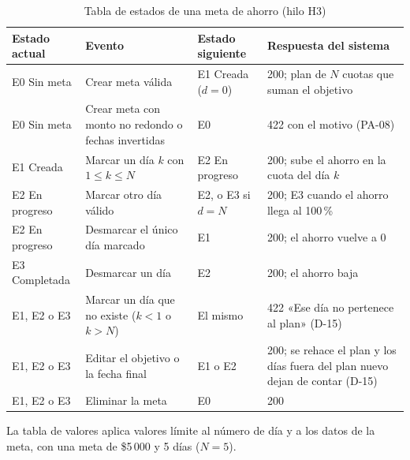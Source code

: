 \begin{table}[H]
\caption{Tabla de estados de una meta de ahorro (hilo H3)}
\label{tab:estados-h3}
\footnotesize
\begin{tabularx}{\linewidth}{L{2.4cm} L{3.4cm} L{2.6cm} Y}
\toprule
Estado actual & Evento & Estado siguiente & Respuesta del sistema \\
\midrule
E0 Sin meta & Crear meta válida & E1 Creada ($d = 0$) & 200; plan de $N$ cuotas que suman el objetivo \\
E0 Sin meta & Crear meta con monto no redondo o fechas invertidas & E0 & 422 con el motivo (PA-08) \\
E1 Creada & Marcar un día $k$ con $1 \leq k \leq N$ & E2 En progreso & 200; sube el ahorro en la cuota del día $k$ \\
E2 En progreso & Marcar otro día válido & E2, o E3 si $d = N$ & 200; E3 cuando el ahorro llega al 100\,\% \\
E2 En progreso & Desmarcar el único día marcado & E1 & 200; el ahorro vuelve a 0 \\
E3 Completada & Desmarcar un día & E2 & 200; el ahorro baja \\
E1, E2 o E3 & Marcar un día que no existe ($k < 1$ o $k > N$) & El mismo & 422 «Ese día no pertenece al plan» (D-15) \\
E1, E2 o E3 & Editar el objetivo o la fecha final & E1 o E2 & 200; se rehace el plan y los días fuera del plan nuevo dejan de contar (D-15) \\
E1, E2 o E3 & Eliminar la meta & E0 & 200 \\
\bottomrule
\end{tabularx}
\end{table}

La tabla de valores aplica valores límite al número de día y a los datos de la meta, con una meta de \$5\,000 y 5 días ($N = 5$).

